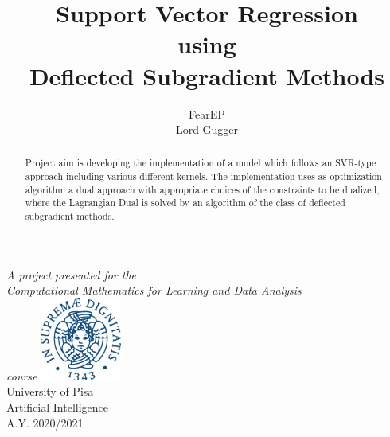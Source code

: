 \documentclass[12pt]{article}
\title{Support Vector Regression\\using\\Deflected Subgradient Methods}
\author{FearEP\\Lord Gugger}
\begin{document}
	\begin{titlepage}
		\maketitle
	   \begin{center}
		\vspace{0.5cm}
	        \textit{A project presented for the\\Computational Mathematics for Learning and Data Analysis\\course}
	       \vfill	     
	       \includegraphics[width=0.2\textwidth]{unipi.png}\\
	       University of Pisa\\
	       Artificial Intelligence\\
			A.Y. 2020/2021\\
	            
	   \end{center}
	\end{titlepage}
	
	\newpage
	\begin{abstract}
		 Project aim is developing the implementation of a model which follows an SVR-type approach including various different kernels. The implementation uses as optimization algorithm a dual approach with appropriate choices of the constraints to be dualized, where the Lagrangian Dual is solved by an algorithm of the class of deflected subgradient methods.
	\end{abstract}
	
\end{document}
